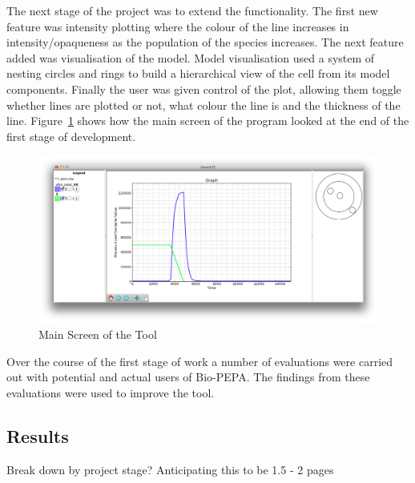 The next stage of the project was to extend the functionality.  The first new feature was intensity plotting where the colour of the line increases in intensity/opaqueness as the population of the species increases.  The next feature added was visualisation of the model.  Model visualisation used a system of nesting circles and rings to build a hierarchical view of the cell from its model components.  Finally the user was given control of the plot, allowing them toggle whether lines are plotted or not, what colour the line is and the thickness of the line.  Figure~\ref{fig:f75_mac_intro} shows how the main screen of the program looked at the end of the first stage of development.

\begin{figure}[h!]
    \centering
    \includegraphics[width=\textwidth]{images/french75_mac.png}
    \caption{Main Screen of the Tool}
    \label{fig:f75_mac_intro}
\end{figure}

Over the course of the first stage of work a number of evaluations were carried out with potential and actual users of Bio-PEPA.  The findings from these evaluations were used to improve the tool.

\subsection{Results}

Break down by project stage?  Anticipating this to be 1.5 - 2 pages

